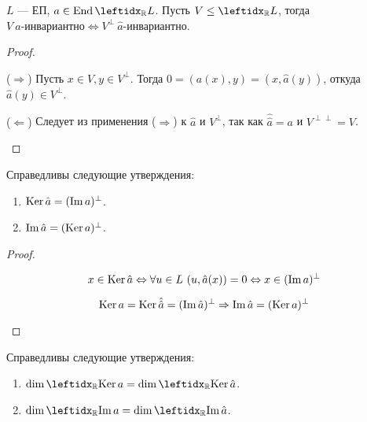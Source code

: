 \begin{cor}
    $L$ --- ЕП, $a \in \End \lsub{\mathbb{R}}{L}$. Пусть $V \le \lsub{\mathbb{R}}{L}$, тогда $V\ a\text{-инвариантно} \Leftrightarrow V^\perp\ \hat{a}\text{-инвариантно}$.
\end{cor}
\begin{proof}
    \begin{proofpart}{($\Rightarrow$)}
        Пусть $x \in V, y \in V^\perp$. Тогда $0 = (a(x), y) = (x, \hat{a}(y))$, откуда $\hat{a}(y) \in V^\perp$.
    \end{proofpart}

    \begin{proofpart}{($\Leftarrow$)}
        Следует из применения ($\Rightarrow$) к $\hat{a}$ и $V^\perp$, так как $\hat{\hat{a}} = a$ и $V^{\perp\perp} = V$.
    \end{proofpart}
\end{proof}

\begin{cor}
    Справедливы следующие утверждения:
    \begin{enumerate}
        \item $\operatorname{Ker} \hat{a} = (\operatorname{Im} a)^\perp$.
        \item $\operatorname{Im} \hat{a} = (\operatorname{Ker} a)^\perp$.
    \end{enumerate}
\end{cor}

\begin{proof}
    \begin{proofpart}
        $$x \in \operatorname{Ker} \hat{a} \Leftrightarrow \forall u \in L\ (u, \hat{a}(x)) = 0 \Leftrightarrow x \in (\operatorname{Im} a)^\perp$$
    \end{proofpart}

    \begin{proofpart}
        $$\operatorname{Ker} a = \operatorname{Ker} \hat{\hat{a}} = (\operatorname{Im} \hat{a})^\perp \Rightarrow \operatorname{Im} \hat{a} = (\operatorname{Ker} a)^\perp$$
    \end{proofpart}
\end{proof}

\begin{cor}
    Справедливы следующие утверждения:
    \begin{enumerate}
        \item $\dim \lsub{\mathbb{R}}{\ker a} = \dim \lsub{\mathbb{R}}{\ker \hat{a}}$.
        \item $\dim \lsub{\mathbb{R}}{\im a} = \dim \lsub{\mathbb{R}}{\im \hat{a}}$.
    \end{enumerate}
\end{cor}

